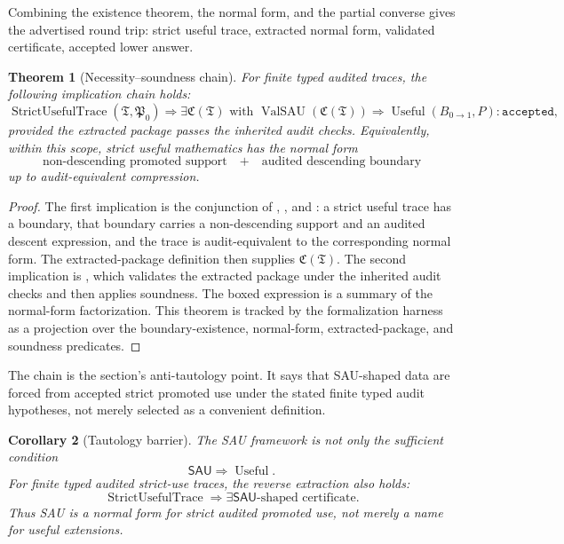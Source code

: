 \documentclass[11pt]{article}
\newcommand{\SAU}{\mathsf{SAU}}
\newcommand{\Use}{\operatorname{Useful}}
\newcommand{\ValSAU}{\operatorname{ValSAU}}
\newtheorem{theorem}{Theorem}[section]
\newtheorem{corollary}[theorem]{Corollary}
\theoremstyle{definition}
\begin{document}
Combining the existence theorem, the normal form, and the partial converse gives
the advertised round trip: strict useful trace, extracted normal form,
validated certificate, accepted lower answer.

\begin{theorem}[Necessity--soundness chain]
\label{thm:sau-necessity-soundness-chain}
For finite typed audited traces, the following implication chain holds:
\[
\operatorname{StrictUsefulTrace}(\mathfrak T,\mathfrak P_0)
\Longrightarrow
\exists\mathfrak C(\mathfrak T)\text{ with }\ValSAU(\mathfrak C(\mathfrak T))
\Longrightarrow
\Use(B_{0\to1},P):\texttt{accepted},
\]
provided the extracted package passes the inherited audit checks.
Equivalently, within this scope, strict useful mathematics has the normal form
\[
\boxed{
\text{non-descending promoted support}
\quad+\quad
\text{audited descending boundary}
}
\]
up to audit-equivalent compression.
\end{theorem}

\begin{proof}
The first implication is the conjunction of
,
, and
: a strict useful trace has a boundary,
that boundary carries a non-descending support and an audited descent
expression, and the trace is audit-equivalent to the corresponding normal
form.  The extracted-package definition then supplies
\(\mathfrak C(\mathfrak T)\).  The second implication is
, which validates the extracted package under
the inherited audit checks and then applies soundness.  The boxed expression is
a summary of the normal-form factorization.  This theorem is tracked by the
formalization harness as a projection over the boundary-existence,
normal-form, extracted-package, and soundness predicates.
\end{proof}

The chain is the section's anti-tautology point.  It says that SAU-shaped data
are forced from accepted strict promoted use under the stated finite typed
audit hypotheses, not merely selected as a convenient definition.

\begin{corollary}[Tautology barrier]
\label{cor:sau-tautology-barrier}
The SAU framework is not only the sufficient condition
\[
\SAU\Rightarrow\Use.
\]
For finite typed audited strict-use traces, the reverse extraction also holds:
\[
\operatorname{StrictUsefulTrace}
\Rightarrow
\exists\SAU\text{-shaped certificate}.
\]
Thus SAU is a normal form for strict audited promoted use, not merely a name for useful extensions.
\end{corollary}
\end{document}
